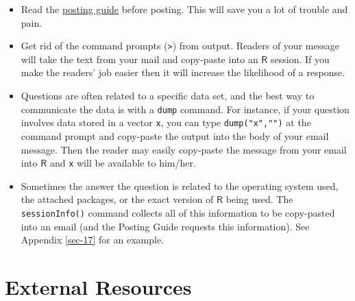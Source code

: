 \begin{itemize}
\item Read the \href{http://www.r-project.org/posting-guide.html}{posting guide} before posting. This will save you a lot of
trouble and pain.
\item Get rid of the command prompts (\texttt{>}) from output. Readers of your
message will take the text from your mail and copy-paste into an
\(\mathsf{R}\) session. If you make the readers' job easier then it
will increase the likelihood of a response.
\item Questions are often related to a specific data set, and the best way
to communicate the data is with a \texttt{dump} 
command. For instance, if your question involves data stored in a
vector \texttt{x}, you can type \texttt{dump("x","")} at the command prompt and
copy-paste the output into the body of your email message. Then the
reader may easily copy-paste the message from your email into
\(\mathsf{R}\) and \texttt{x} will be available to him/her.
\item Sometimes the answer the question is related to the operating system
used, the attached packages, or the exact version of \(\mathsf{R}\)
being used. The \texttt{sessionInfo()}
 command collects
all of this information to be copy-pasted into an email (and the
Posting Guide requests this information). See Appendix
\ref{sec-17} for an example.
\end{itemize}

\section{External Resources}
\label{sec-2-5}

